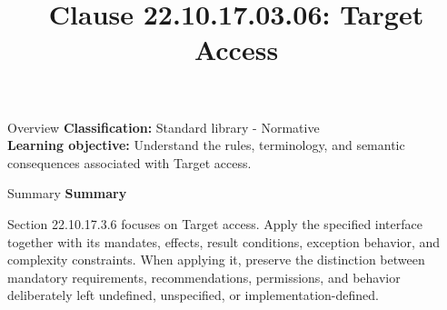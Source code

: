 \documentclass[10pt,letterpaper]{article}
\title{Clause 22.10.17.03.06: Target Access}
\author{}
\date{}
\begin{document}
\maketitle
\begin{CornellOverviewBox}{Overview}
\textbf{Classification:} Standard library - Normative\\[2pt]
\textbf{Learning objective:} Understand the rules, terminology, and semantic consequences associated with Target access.
\end{CornellOverviewBox}\begin{CornellSummaryBox}{Summary}
{\sffamily\bfseries\color{Accent} Summary}\par\vspace{3pt}Section 22.10.17.3.6 focuses on Target access. Apply the specified interface together with its mandates, effects, result conditions, exception behavior, and complexity constraints. When applying it, preserve the distinction between mandatory requirements, recommendations, permissions, and behavior deliberately left undefined, unspecified, or implementation-defined.
\end{CornellSummaryBox}
\end{document}

